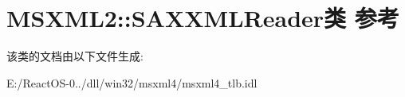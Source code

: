 \hypertarget{class_m_s_x_m_l2_1_1_s_a_x_x_m_l_reader}{}\section{M\+S\+X\+M\+L2\+:\+:S\+A\+X\+X\+M\+L\+Reader类 参考}
\label{class_m_s_x_m_l2_1_1_s_a_x_x_m_l_reader}


该类的文档由以下文件生成\+:\begin{DoxyCompactItemize}
\item 
E\+:/\+React\+O\+S-\/0../dll/win32/msxml4/msxml4\+\_\+tlb.\+idl\end{DoxyCompactItemize}
